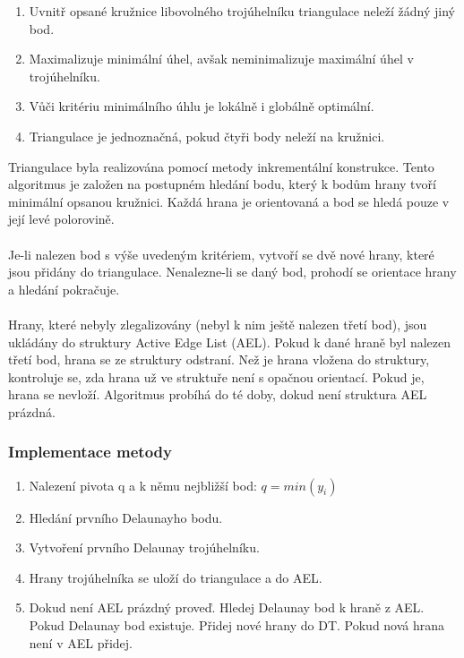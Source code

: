 \documentclass[a4paper, 12pt]{article}
\begin{document}
\begin{enumerate}
\item Uvnitř opsané kružnice libovolného trojúhelníku triangulace neleží žádný jiný bod.
\item Maximalizuje minimální úhel, avšak neminimalizuje maximální úhel v trojúhelníku.
\item Vůči kritériu minimálního úhlu je lokálně i globálně optimální.
\item Triangulace je jednoznačná, pokud čtyři body neleží na kružnici.
\end{enumerate}


Triangulace byla realizována pomocí metody inkrementální konstrukce. Tento algoritmus je založen na postupném hledání bodu, který k bodům hrany tvoří minimální opsanou kružnici. Každá hrana je orientovaná a bod se hledá pouze v její levé polorovině.\\
\\
Je-li nalezen bod s výše uvedeným kritériem, vytvoří se dvě nové hrany, které jsou přidány do triangulace. Nenalezne-li se daný bod, prohodí se orientace hrany a hledání pokračuje.\\
\\
Hrany, které nebyly zlegalizovány (nebyl k nim ještě nalezen třetí bod), jsou ukládány do struktury Active Edge List (AEL). Pokud k dané hraně byl nalezen třetí bod, hrana se ze struktury odstraní. Než je hrana vložena do struktury, kontroluje se, zda hrana už ve struktuře není s opačnou orientací. Pokud je, hrana se nevloží. Algoritmus probíhá do té doby, dokud není struktura AEL prázdná.

\subsubsection{Implementace metody}
\begin{enumerate}
\item Nalezení pivota q a k němu nejbližší bod:  $ q = min(y_i) $ 
\item Hledání prvního Delaunayho bodu.
\item Vytvoření prvního Delaunay trojúhelníku.
\item Hrany trojúhelníka se uloží do triangulace a do AEL.
\item Dokud není AEL prázdný proveď.
\subitem Hledej Delaunay bod k hraně z AEL.
\subitem Pokud Delaunay bod existuje.
\subsubitem Přidej nové hrany do DT.
\subsubitem Pokud nová hrana není v AEL přidej.
\end{enumerate}
\end{document}
